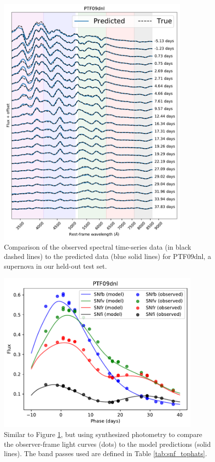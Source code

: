 \begin{figure}
    \centering
    \includegraphics[width=0.85\textwidth]{figures/nn_twins/PTF09dnl_embed2spec.pdf}
    \caption{Comparison of the observed spectral time-series data (in black dashed lines) to the predicted data (blue solid lines) for PTF09dnl, a supernova in our held-out test set.}
    \label{fig:PTF09dnl_spec}
\end{figure}

\begin{figure}
    \centering
    \includegraphics[width=0.9\textwidth]{figures/nn_twins/PTF09dnl_lc.pdf}
    \caption{Similar to Figure \ref{fig:PTF09dnl_spec}, but using synthesized photometry to compare the observer-frame light curves (dots) to the model predictions (solid lines). The band passes used are defined in Table \ref{tab:snf_tophats}.}
    \label{fig:PTF09dnl_lc}
\end{figure}

